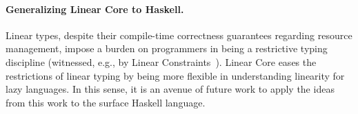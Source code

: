 \documentclass[acmsmall,review,anonymous,screen]{acmart}
\begin{document}
\paragraph{Generalizing Linear Core to Haskell.}
Linear types, despite their compile-time correctness guarantees regarding
resource management, impose a burden on programmers in being a restrictive
typing discipline (witnessed, e.g., by Linear
Constraints~\cite{cite:linearconstraints}). Linear Core eases the restrictions
of linear typing by being more flexible in understanding linearity for lazy
languages. In this sense, it is an avenue of future
work to apply the ideas from this work to the surface Haskell language.



% 
% 
% 
% 
% 
% 
% 
% 
% 
\end{document}
